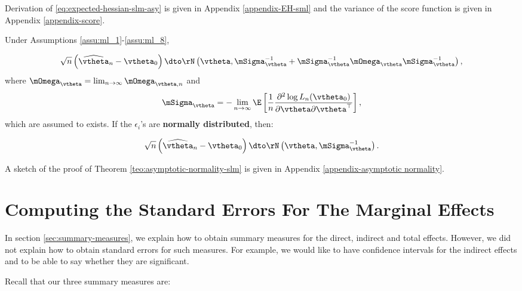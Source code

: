 \documentclass[english,12pt]{book}\usepackage[]{graphicx}\usepackage[]{xcolor}
\begin{document}
Derivation of \eqref{eq:expected-hessian-slm-asy} is given in Appendix \ref{appendix-EH-sml} and the variance of the score function is given in Appendix \ref{appendix-score}.


\begin{theorem}\label{teo:asymptotic-normality-slm}
Under Assumptions \ref{assu:ml_1}-\ref{assu:ml_8}, 

\begin{equation}
  \sqrt{n}\left(\widehat{\vtheta}_n- \vtheta_0\right)\dto \rN\left(\vtheta, \mSigma_{\vtheta}^{-1} + \mSigma_{\vtheta}^{-1}\mOmega_{\vtheta}\mSigma_{\vtheta}^{-1}\right),
\end{equation}
%
where $\mOmega_{\vtheta} = \lim_{n\to\infty}\mOmega_{\vtheta, n}$ and
\begin{equation}
  \mSigma_{\vtheta}= - \lim_{n\to\infty} \E\left[\frac{1}{n}\frac{\partial^2 \log L_n(\vtheta_0)}{\partial \vtheta \partial \vtheta^\top}\right],
\end{equation}
which are assumed to exists. If the $\epsilon_i$'s are \textbf{normally distributed}, then:

\begin{equation}
  \sqrt{n}\left(\widehat{\vtheta}_n- \vtheta_0\right)\dto \rN\left(\vtheta, \mSigma_{\vtheta}^{-1}\right).
\end{equation}
\end{theorem}

A sketch of the proof of Theorem \ref{teo:asymptotic-normality-slm} is given in Appendix \ref{appendix-asymptotic normality}.

\section{Computing the Standard Errors For The Marginal Effects}

In section \ref{sec:summary-measures}, we explain how to obtain summary measures for the direct, indirect and total effects. However, we did not explain how to obtain standard errors for such measures. For example, we would like to have confidence intervals for the indirect effects and to be able to say whether they are significant. 

Recall that our three summary measures are:
\end{document}
